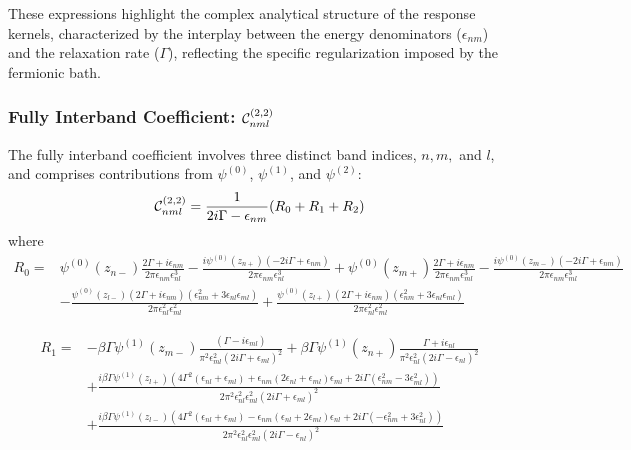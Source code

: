 \documentclass[twocolumn, prx, reprint, amsfonts, amsmath, amssymb, longbibliography, floatfix, aps]{revtex4-2}
\begin{document}
These expressions highlight the complex analytical structure of the response kernels, characterized by the interplay between the energy denominators ($\epsilon_{nm}$) and the relaxation rate ($\Gamma$), reflecting the specific regularization imposed by the fermionic bath.

\subsubsection{Fully Interband Coefficient: \texorpdfstring{${\cal C}_{nml}^{(2, 2)}$}{Cnml}}
The fully interband coefficient involves three distinct band indices, $n, m,$ and $l$, and comprises contributions from $\psi^{(0)}$, $\psi^{(1)}$, and $\psi^{(2)}$:
\begin{equation}
	{\cal C}_{nml}^{(2, 2)} = \frac{1}{2i\Gamma - \epsilon_{nm}}(R_0 + R_1 + R_2)
\end{equation}
where
\begin{equation}
	\begin{aligned}
		R_0 = & \psi^{(0)}(z_{n-}) \frac{2 \Gamma + i \epsilon_{nm}}{2 \pi \epsilon_{nm} \epsilon_{nl}^3} - \frac{i \psi^{(0)}(z_{n+}) (-2 i \Gamma + \epsilon_{nm})}{2 \pi \epsilon_{nm} \epsilon_{nl}^3}
		+ \psi^{(0)}(z_{m+}) \frac{2 \Gamma + i \epsilon_{nm}}{2 \pi \epsilon_{nm} \epsilon_{ml}^3} - \frac{i \psi^{(0)}(z_{m-}) (-2 i \Gamma + \epsilon_{nm})}{2 \pi \epsilon_{nm} \epsilon_{ml}^3} \\
		& - \frac{\psi^{(0)}(z_{l-}) (2 \Gamma + i \epsilon_{nm}) (\epsilon_{nm}^2 + 3 \epsilon_{nl} \epsilon_{ml})}{2 \pi \epsilon_{nl}^2 \epsilon_{ml}^2} + \frac{\psi^{(0)}(z_{l+}) (2 \Gamma + i \epsilon_{nm}) (\epsilon_{nm}^2 + 3 \epsilon_{nl} \epsilon_{ml})}{2 \pi \epsilon_{nl}^2 \epsilon_{ml}^2}
	\end{aligned}
\end{equation}

\begin{equation}
	\begin{aligned}
		R_1 = & -\beta \Gamma \psi^{(1)}(z_{m-}) \frac{(\Gamma - i \epsilon_{ml})}{\pi^2 \epsilon_{ml}^2 (2 i \Gamma + \epsilon_{ml})^2} + \beta \Gamma \psi^{(1)}(z_{n+}) \frac{\Gamma + i \epsilon_{nl}}{\pi^2 \epsilon_{nl}^2 (2 i \Gamma - \epsilon_{nl})^2} \\
		& + \frac{i \beta \Gamma \psi^{(1)}(z_{l+}) \left( 4 \Gamma^2 (\epsilon_{nl} + \epsilon_{ml}) + \epsilon_{nm} (2 \epsilon_{nl} + \epsilon_{ml}) \epsilon_{ml} + 2 i \Gamma (\epsilon_{nm}^2 - 3 \epsilon_{ml}^2) \right)}{2 \pi^2 \epsilon_{nl}^2 \epsilon_{ml}^2 (2 i \Gamma + \epsilon_{ml})^2} \\
		& + \frac{i \beta \Gamma \psi^{(1)}(z_{l-}) \left( 4 \Gamma^2 (\epsilon_{nl} + \epsilon_{ml}) - \epsilon_{nm} (\epsilon_{nl} + 2 \epsilon_{ml}) \epsilon_{nl} + 2 i \Gamma (-\epsilon_{nm}^2 + 3 \epsilon_{nl}^2) \right)}{2 \pi^2 \epsilon_{nl}^2 \epsilon_{ml}^2 (2 i \Gamma - \epsilon_{nl})^2}
	\end{aligned}
\end{equation}
\end{document}
